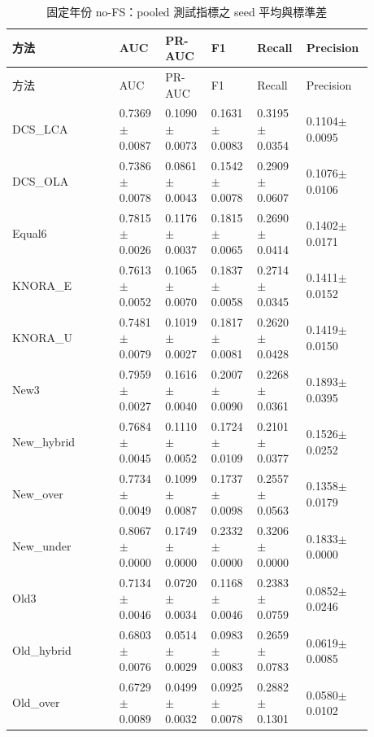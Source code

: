 \begingroup
\scriptsize
\setlength{\tabcolsep}{3pt}
\setlength{\LTleft}{0pt}
\setlength{\LTright}{0pt}
\begin{longtable}{p{0.28\linewidth}p{0.12\linewidth}p{0.12\linewidth}p{0.12\linewidth}p{0.12\linewidth}p{0.12\linewidth}}
\caption{固定年份 no-FS：pooled 測試指標之 seed 平均與標準差}\label{tab:fixed_no_fs_pooled}\\
\toprule
方法 & AUC & PR-AUC & F1 & Recall & Precision \\
\midrule
\endfirsthead
\toprule
方法 & AUC & PR-AUC & F1 & Recall & Precision \\
\midrule
\endhead
\bottomrule
\endfoot
DCS\_\allowbreak{}LCA & 0.7369\(\pm\)0.0087 & 0.1090\(\pm\)0.0073 & 0.1631\(\pm\)0.0083 & 0.3195\(\pm\)0.0354 & 0.1104\(\pm\)0.0095 \\
DCS\_\allowbreak{}OLA & 0.7386\(\pm\)0.0078 & 0.0861\(\pm\)0.0043 & 0.1542\(\pm\)0.0078 & 0.2909\(\pm\)0.0607 & 0.1076\(\pm\)0.0106 \\
Equal6 & 0.7815\(\pm\)0.0026 & 0.1176\(\pm\)0.0037 & 0.1815\(\pm\)0.0065 & 0.2690\(\pm\)0.0414 & 0.1402\(\pm\)0.0171 \\
KNORA\_\allowbreak{}E & 0.7613\(\pm\)0.0052 & 0.1065\(\pm\)0.0070 & 0.1837\(\pm\)0.0058 & 0.2714\(\pm\)0.0345 & 0.1411\(\pm\)0.0152 \\
KNORA\_\allowbreak{}U & 0.7481\(\pm\)0.0079 & 0.1019\(\pm\)0.0027 & 0.1817\(\pm\)0.0081 & 0.2620\(\pm\)0.0428 & 0.1419\(\pm\)0.0150 \\
New3 & 0.7959\(\pm\)0.0027 & 0.1616\(\pm\)0.0040 & 0.2007\(\pm\)0.0090 & 0.2268\(\pm\)0.0361 & 0.1893\(\pm\)0.0395 \\
New\_\allowbreak{}hybrid & 0.7684\(\pm\)0.0045 & 0.1110\(\pm\)0.0052 & 0.1724\(\pm\)0.0109 & 0.2101\(\pm\)0.0377 & 0.1526\(\pm\)0.0252 \\
New\_\allowbreak{}over & 0.7734\(\pm\)0.0049 & 0.1099\(\pm\)0.0087 & 0.1737\(\pm\)0.0098 & 0.2557\(\pm\)0.0563 & 0.1358\(\pm\)0.0179 \\
New\_\allowbreak{}under & 0.8067\(\pm\)0.0000 & 0.1749\(\pm\)0.0000 & 0.2332\(\pm\)0.0000 & 0.3206\(\pm\)0.0000 & 0.1833\(\pm\)0.0000 \\
Old3 & 0.7134\(\pm\)0.0046 & 0.0720\(\pm\)0.0034 & 0.1168\(\pm\)0.0046 & 0.2383\(\pm\)0.0759 & 0.0852\(\pm\)0.0246 \\
Old\_\allowbreak{}hybrid & 0.6803\(\pm\)0.0076 & 0.0514\(\pm\)0.0029 & 0.0983\(\pm\)0.0083 & 0.2659\(\pm\)0.0783 & 0.0619\(\pm\)0.0085 \\
Old\_\allowbreak{}over & 0.6729\(\pm\)0.0089 & 0.0499\(\pm\)0.0032 & 0.0925\(\pm\)0.0078 & 0.2882\(\pm\)0.1301 & 0.0580\(\pm\)0.0102 \\

\end{longtable}
